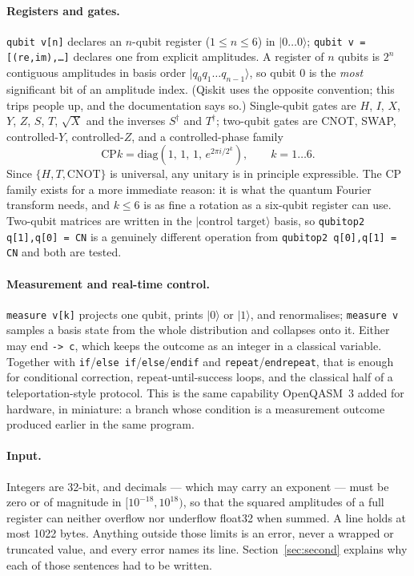 \documentclass[11pt]{article}
\newcommand{\ket}[1]{\ensuremath{|#1\rangle}}
\begin{document}
\paragraph{Registers and gates.} \texttt{qubit v[n]} declares an $n$-qubit register
($1 \le n \le 6$) in \ket{0\ldots0}; \texttt{qubit v = [(re,im),\ldots]} declares one from
explicit amplitudes. A register of $n$ qubits is $2^n$ contiguous amplitudes in basis order
$\ket{q_0 q_1 \ldots q_{n-1}}$, so qubit 0 is the \emph{most} significant bit of an
amplitude index. (Qiskit uses the opposite convention; this trips people up, and the
documentation says so.) Single-qubit gates are $H$, $I$, $X$, $Y$, $Z$, $S$, $T$,
$\sqrt{X}$ and the inverses $S^\dagger$ and $T^\dagger$; two-qubit gates are CNOT, SWAP, controlled-$Y$, controlled-$Z$, and a
controlled-phase family
\[
  \mathrm{CP}k = \mathrm{diag}\!\left(1,\,1,\,1,\,e^{2\pi i/2^{k}}\right),
  \qquad k = 1 \ldots 6 .
\]
Since $\{H, T, \mathrm{CNOT}\}$ is universal, any unitary is in principle expressible. The
$\mathrm{CP}$ family exists for a more immediate reason: it is what the quantum Fourier
transform needs, and $k \le 6$ is as fine a rotation as a six-qubit register can use.
Two-qubit matrices are written in the $\ket{\text{control target}}$ basis, so
\texttt{qubitop2 q[1],q[0] = CN} is a genuinely different operation from
\texttt{qubitop2 q[0],q[1] = CN} and both are tested.

\paragraph{Measurement and real-time control.} \texttt{measure v[k]} projects one qubit,
prints \ket{0} or \ket{1}, and renormalises; \texttt{measure v} samples a basis state from
the whole distribution and collapses onto it. Either may end \texttt{-> c}, which keeps the
outcome as an integer in a classical variable. Together with \texttt{if}/\texttt{else
if}/\texttt{else}/\texttt{endif} and \texttt{repeat}/\texttt{endrepeat}, that is enough for
conditional correction, repeat-until-success loops, and the classical half of a
teleportation-style protocol. This is the same capability OpenQASM~3 added for hardware, in
miniature: a branch whose condition is a measurement outcome produced earlier in the same
program.

\paragraph{Input.} Integers are 32-bit, and decimals --- which may carry an exponent --- must
be zero or of magnitude in $[10^{-18}, 10^{18})$, so that the squared amplitudes of a full
register can neither overflow nor underflow float32 when summed. A line holds at most 1022
bytes. Anything outside those limits is an error, never a wrapped or truncated value, and
every error names its line. Section~\ref{sec:second} explains why each of those sentences
had to be written.
\end{document}
